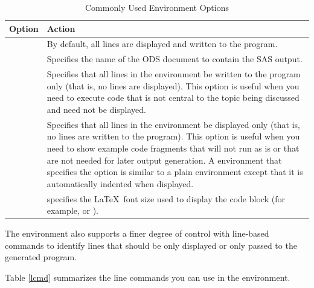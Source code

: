 \documentclass[article,oneside]{memoir}
\begin{document}
\begin{table}[H]
\caption{Commonly Used  Environment Options}\label{scopt}
\begin{tabular}{lP{3.75in}}
\hline
\textbf{Option}  &  \textbf{Action} \\
\hline
& By default, all lines are displayed and written to the program. \\[0.5\baselineskip]
      &
         Specifies the name of the ODS document to contain the SAS output.
\\[0.5\baselineskip]

     & Specifies that  all lines in the environment
                     be written to the program only
                (that is, no lines are displayed). This option is useful when you need
                to execute code that is not central to the topic being discussed and need not
                be displayed.
\\[0.5\baselineskip]
     &
                  Specifies that all lines in the environment
                  be displayed only (that is, no lines are written to the program).
                This option is
                useful when you need to show example code
                fragments that will not run as is or that are not needed
                for later output generation. A  environment that specifies
                the  option is similar to a plain  environment except
                that it is automatically indented when displayed.
\\[0.5\baselineskip]
   &
        specifies the \LaTeX\ font size used to display the
       code block (for example,  or ).
\\
\hline
\end{tabular}
\end{table}

The  environment also supports
a finer degree of control with line-based commands to identify lines that should
be only displayed or only passed to the generated program.

Table \ref{lcmd} summarizes the line commands you can use in the  environment.
\end{document}
